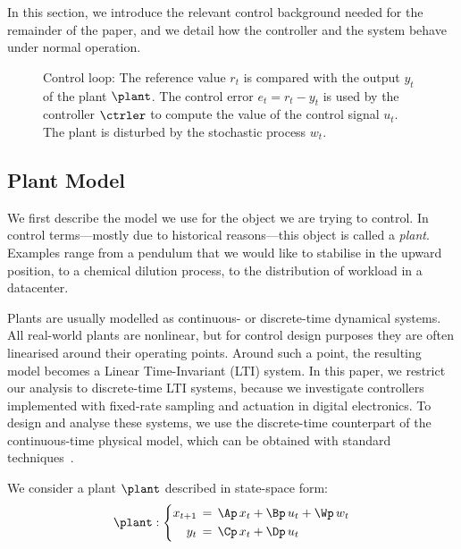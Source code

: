 In this section, we introduce the relevant control background needed for the remainder of the paper, and we detail how the controller and the system behave under normal operation.

\begin{figure}[t]
\centering

\caption{Control loop: The reference value $r_t$ is compared with the output $y_t$ of the plant $\plant$.
    The control error $e_t = r_t - y_t$ is used by the controller $\ctrler$ to compute the value of the control signal $u_t$.
    The plant is disturbed by the stochastic process $w_t$.}
\label{fig:loop}
\end{figure}

\subsection{Plant Model}

We first describe the model we use for the object we are trying to control.
In control terms---mostly due to historical reasons---this object is called a \emph{plant}.
Examples range from a pendulum that we would like to stabilise in the upward position, to a chemical dilution process, to the distribution of workload in a datacenter.

Plants are usually modelled as continuous- or discrete-time dynamical systems. 
All real-world plants are nonlinear, but for control design purposes they are often linearised around their operating points.
Around such a point, the resulting model becomes a Linear Time-Invariant (LTI) system.
In this paper, we restrict our analysis to discrete-time LTI systems, because we investigate controllers implemented with fixed-rate sampling and actuation in digital electronics.
To design and analyse these systems, we use the discrete-time counterpart of the continuous-time physical model, which can be obtained with standard techniques~\cite{Astrom:1997}.

We consider a plant $\plant$ described in state-space form:
\begin{equation}
\label{eq:background:plant}
    \plant : \left\{
    \begin{aligned}
        x_{t+1} &\,=\,  \Ap\,x_t + \Bp\,u_t + \Wp\,w_t \\
        y_t &\,=\, \Cp\,x_t + \Dp\,u_t
    \end{aligned}
    \right.
\end{equation}

